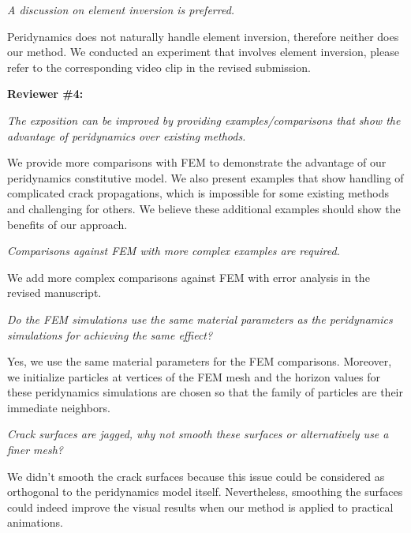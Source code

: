 \emph{A discussion on element inversion is preferred.}

Peridynamics does not naturally handle element inversion, therefore neither does our method. We conducted an experiment that involves element inversion, please refer to the corresponding video clip in the revised submission.

\noindent{}\textbf{Reviewer \#4:}

\emph{The exposition can be improved by providing examples/comparisons that show the advantage of peridynamics over existing methods.}

We provide more comparisons with FEM to demonstrate the advantage of our peridynamics constitutive model. We also present examples that show handling of complicated crack propagations, which is impossible for some existing methods and challenging for others. We believe these additional examples should show the benefits of our approach.

\emph{Comparisons against FEM with more complex examples are required.}

We add more complex comparisons against FEM with error analysis in the revised manuscript.

\emph{Do the FEM simulations use the same material parameters as the peridynamics simulations for achieving the same effiect?}

Yes, we use the same material parameters for the FEM comparisons. Moreover, we initialize particles at vertices of the FEM mesh and the horizon values for these peridynamics simulations are chosen so that the family of particles are their immediate neighbors.

\emph{Crack surfaces are jagged, why not smooth these surfaces or alternatively use a finer mesh?}

We didn't smooth the crack surfaces because this issue could be considered as orthogonal to the peridynamics model itself. Nevertheless, smoothing the surfaces could indeed improve the visual results when our method is applied to practical animations.



%





